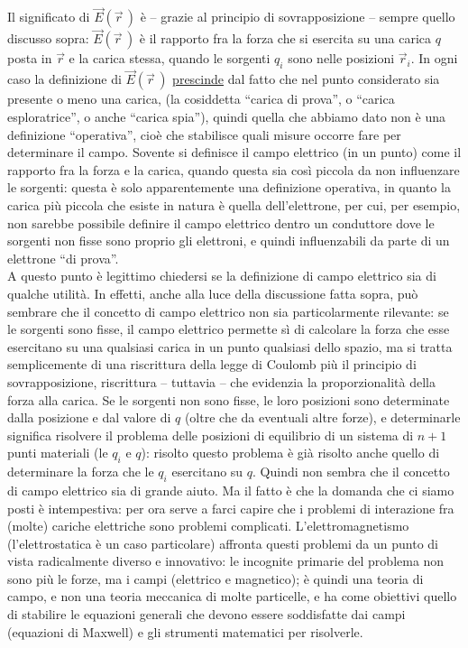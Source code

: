 Il significato di $\vec E(\vec r\,)$ è -- grazie al principio di sovrapposizione -- sempre quello discusso sopra: $\vec E(\vec r\,)$ è il rapporto fra la forza che si esercita su una carica $q$ posta in $\vec r$ e la carica stessa, quando le sorgenti $q_i$ sono nelle posizioni $\vec r_i$. In ogni caso la definizione di $\vec E(\vec r\,)$ \underline{prescinde} dal fatto che nel punto considerato sia presente o meno una carica, (la cosiddetta ``carica di prova'', o ``carica esploratrice'', o anche ``carica spia''), quindi quella che abbiamo dato non è una definizione ``operativa'', cioè che stabilisce quali misure occorre fare per determinare il campo. Sovente si definisce il campo elettrico (in un punto) come il rapporto fra la forza e la carica, quando questa sia così piccola da non influenzare le sorgenti: questa è solo apparentemente una definizione operativa, in quanto la carica più piccola che esiste in natura è quella dell'elettrone, per cui, per esempio, non sarebbe possibile definire il campo elettrico dentro un conduttore dove le sorgenti non fisse sono proprio gli elettroni, e quindi influenzabili da parte di un elettrone ``di prova''.\\
A questo punto è legittimo chiedersi se la definizione di campo elettrico sia di qualche utilità. In effetti, anche alla luce della discussione fatta sopra, può sembrare che il concetto di campo elettrico non sia particolarmente rilevante: se le sorgenti sono fisse, il campo elettrico permette sì di calcolare la forza che esse esercitano su una qualsiasi carica in un punto qualsiasi dello spazio, ma si tratta semplicemente di una riscrittura della legge di Coulomb più il principio di sovrapposizione, riscrittura -- tuttavia -- che evidenzia la proporzionalità della forza alla carica. Se le sorgenti non sono fisse, le loro posizioni sono determinate dalla posizione e dal valore di $q$ (oltre che da eventuali altre forze), e determinarle significa risolvere il problema delle posizioni di equilibrio di un sistema di $n+1$ punti materiali (le $q_i$ e $q$): risolto questo problema è già risolto anche quello di determinare la forza che le $q_i$ esercitano su $q$. Quindi non sembra che il concetto di campo elettrico sia di grande aiuto. Ma il fatto è che la domanda che ci siamo posti è intempestiva: per ora serve a farci capire che i problemi di interazione fra (molte) cariche elettriche sono problemi complicati. L'elettromagnetismo (l'elettrostatica è un caso particolare) affronta questi problemi da un punto di vista radicalmente diverso e innovativo: le incognite primarie del problema non sono più le forze, ma i campi (elettrico e magnetico); è quindi una teoria di campo, e non una teoria meccanica di molte particelle, e ha come obiettivi quello di stabilire le equazioni generali che devono essere soddisfatte dai campi (equazioni di Maxwell) e gli strumenti matematici per risolverle.\\
